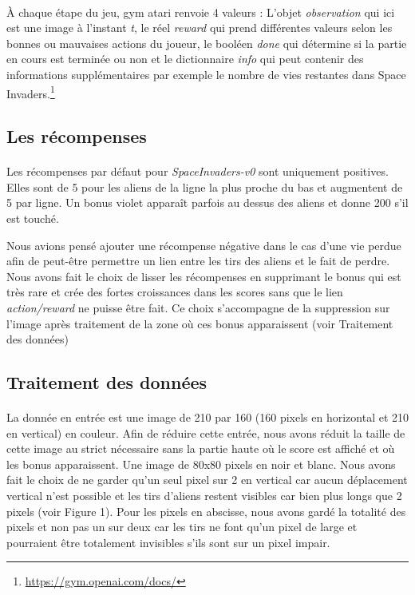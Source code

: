 \documentclass[12pt,oneside,a4paper]{article}
\begin{document}
    \paragraph{}
    À chaque étape du jeu, gym atari renvoie 4 valeurs :
    L'objet \textit{observation} qui ici est une image à l'instant \textit{t}, le réel \textit{reward} qui
    prend différentes valeurs selon les bonnes ou mauvaises actions du joueur,
    le booléen \textit{done} qui détermine si la partie en cours est terminée ou non et
    le dictionnaire \textit{info} qui peut contenir des informations supplémentaires
    par exemple le nombre de vies restantes dans Space Invaders.\footnote{\url{https://gym.openai.com/docs/}}

    \subsection{Les récompenses}

    \paragraph{}
    Les récompenses par défaut pour \textit{SpaceInvaders-v0} sont uniquement positives.
    Elles sont de 5 pour les aliens de la ligne la plus proche du bas et augmentent de 5 par ligne.
    Un bonus violet apparaît parfois au dessus des aliens et donne 200 s'il est touché.

    Nous avions pensé ajouter une récompense négative dans le cas d'une vie perdue afin de peut-être
    permettre un lien entre les tirs des aliens et le fait de perdre. Nous avons fait le choix de lisser les
    récompenses en supprimant le bonus qui est très rare et crée des fortes croissances dans les scores sans que
    le lien \textit{action/reward} ne puisse être fait. Ce choix s'accompagne de la suppression sur l'image
    après traitement de la zone où ces bonus apparaissent (voir Traitement des données)

    \newpage

    \subsection{Traitement des données}

    \paragraph{}
    La donnée en entrée est une image de 210 par 160 (160 pixels en horizontal et 210 en vertical)
    en couleur. Afin de réduire cette entrée, nous avons réduit la taille de cette image au strict nécessaire sans la
    partie haute où le score est affiché et où les bonus apparaissent.
    Une image de 80x80 pixels en noir et blanc. Nous avons fait le choix
    de ne garder qu'un seul pixel sur 2 en vertical car aucun déplacement vertical n'est possible et
    les tirs d'aliens restent visibles car bien plus longs que 2 pixels (voir Figure 1). Pour les pixels en abscisse,
    nous avons gardé la totalité des pixels et non pas un sur deux car les tirs
    ne font qu'un pixel de large et pourraient être totalement invisibles s'ils sont sur un pixel impair.
\end{document}
